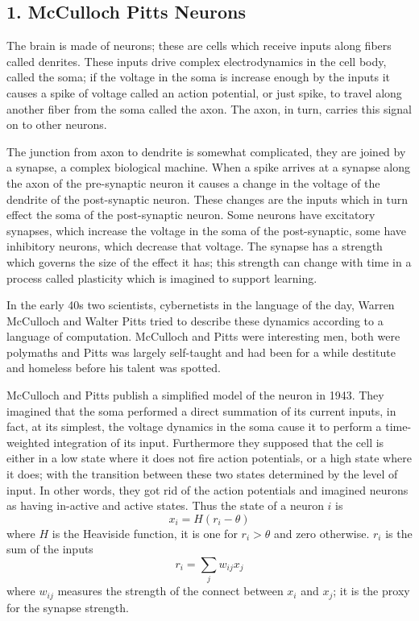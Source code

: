 \documentclass[11pt,a4paper]{scrartcl}
\begin{document}
\subsection*{1. McCulloch Pitts Neurons}

The brain is made of neurons; these are cells which receive inputs
along fibers called denrites. These inputs drive complex
electrodynamics in the cell body, called the soma; if the voltage in
the soma is increase enough by the inputs it causes a spike of voltage
called an action potential, or just spike, to travel along another
fiber from the soma called the axon. The axon, in turn, carries this
signal on to other neurons. 

The junction from axon to dendrite is somewhat complicated, they are
joined by a synapse, a complex biological machine. When a spike
arrives at a synapse along the axon of the pre-synaptic neuron it
causes a change in the voltage of the dendrite of the post-synaptic
neuron. These changes are the inputs which in turn effect the soma of
the post-synaptic neuron. Some neurons have excitatory synapses, which
increase the voltage in the soma of the post-synaptic, some have
inhibitory neurons, which decrease that voltage. The synapse has a
strength which governs the size of the effect it has; this strength
can change with time in a process called plasticity which is imagined
to support learning.

In the early 40s two scientists, cybernetists in the language of the
day, Warren McCulloch and Walter Pitts tried to describe these
dynamics according to a language of computation. McCulloch and Pitts
were interesting men, both were polymaths and Pitts was largely
self-taught and had been for a while destitute and homeless before his
talent was spotted. 

McCulloch and Pitts publish a simplified model of the neuron in
1943. They imagined that the soma performed a direct summation of its
current inputs, in fact, at its simplest, the voltage dynamics in the
soma cause it to perform a time-weighted integration of its
input. Furthermore they supposed that the cell is either in a low
state where it does not fire action potentials, or a high state where
it does; with the transition between these two states determined by
the level of input. In other words, they got rid of the action
potentials and imagined neurons as having in-active and active
states. Thus the state of a neuron $i$ is
\begin{equation}
x_i=H(r_i-\theta)
\end{equation}
where $H$ is the Heaviside function, it is one for $r_i>\theta$ and
zero otherwise. $r_i$ is the sum of the inputs
\begin{equation}
r_i=\sum_{j} w_{ij}x_j
\end{equation}
where $w_{ij}$ measures the strength of the connect between $x_i$ and
$x_j$; it is the proxy for the synapse strength.
\end{document}
